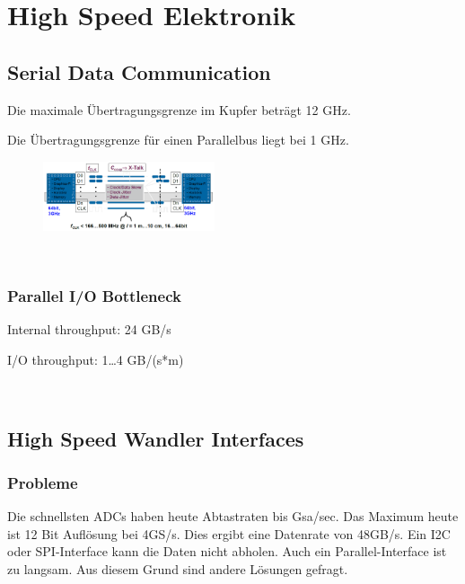 \section{High Speed Elektronik}
\subsection{Serial Data Communication}
\begin{compactitem}
    \item Die maximale Übertragungsgrenze im Kupfer beträgt 12 GHz.
    \item Die Übertragungsgrenze für einen Parallelbus liegt bei 1 GHz.
\end{compactitem}

\begin{figure}
    \centering
    \includegraphics[width=0.45\textwidth]{images/parallel_bottleneck}
\end{figure}
\ 
\vspace{-5pt}
\subsubsection{Parallel I/O Bottleneck}
\begin{compactitem}
    \item Internal throughput: 24 GB/s
    \item I/O throughput: 1…4 GB/(s*m)
\end{compactitem}
\ \\

\subsection{High Speed Wandler Interfaces}
\subsubsection{Probleme}
Die schnellsten ADCs haben heute Abtastraten bis Gsa/sec. Das Maximum heute ist 12 Bit Auflösung bei 4GS/s. Dies ergibt eine Datenrate von 48GB/s. Ein I2C oder SPI-Interface kann die Daten nicht abholen. Auch ein Parallel-Interface ist zu langsam. Aus diesem Grund sind andere Lösungen gefragt.

